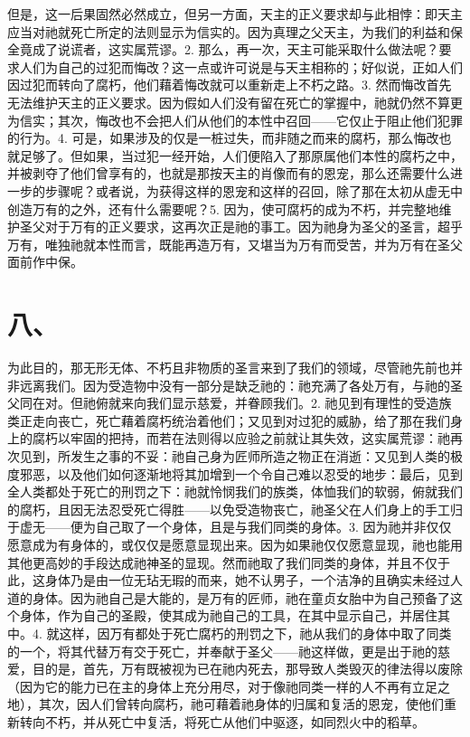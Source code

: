 但是，这一后果固然必然成立，但另一方面，天主的正义要求却与此相悖：即天主应当对祂就死亡所定的法则显示为信实的。因为真理之父天主，为我们的利益和保全竟成了说谎者，这实属荒谬。2. 那么，再一次，天主可能采取什么做法呢？要求人们为自己的过犯而悔改？这一点或许可说是与天主相称的；好似说，正如人们因过犯而转向了腐朽，他们藉着悔改就可以重新走上不朽之路。3. 然而悔改首先无法维护天主的正义要求。因为假如人们没有留在死亡的掌握中，祂就仍然不算更为信实；其次，悔改也不会把人们从他们的本性中召回——它仅止于阻止他们犯罪的行为。4. 可是，如果涉及的仅是一桩过失，而非随之而来的腐朽，那么悔改也就足够了。但如果，当过犯一经开始，人们便陷入了那原属他们本性的腐朽之中，并被剥夺了他们曾享有的，也就是那按天主的肖像而有的恩宠，那么还需要什么进一步的步骤呢？或者说，为获得这样的恩宠和这样的召回，除了那在太初从虚无中创造万有的之外，还有什么需要呢？5. 因为，使可腐朽的成为不朽，并完整地维护圣父对于万有的正义要求，这再次正是祂的事工。因为祂身为圣父的圣言，超乎万有，唯独祂就本性而言，既能再造万有，又堪当为万有而受苦，并为万有在圣父面前作中保。\par


\section{八、}

为此目的，那无形无体、不朽且非物质的圣言来到了我们的领域，尽管祂先前也并非远离我们。因为受造物中没有一部分是缺乏祂的：祂充满了各处万有，与祂的圣父同在对。但祂俯就来向我们显示慈爱，并眷顾我们。2. 祂见到有理性的受造族类正走向丧亡，死亡藉着腐朽统治着他们；又见到对过犯的威胁，给了那在我们身上的腐朽以牢固的把持，而若在法则得以应验之前就让其失效，这实属荒谬：祂再次见到，所发生之事的不妥：祂自己身为匠师所造之物正在消逝：又见到人类的极度邪恶，以及他们如何逐渐地将其加增到一个令自己难以忍受的地步：最后，见到全人类都处于死亡的刑罚之下：祂就怜悯我们的族类，体恤我们的软弱，俯就我们的腐朽，且因无法忍受死亡得胜——以免受造物丧亡，祂圣父在人们身上的手工归于虚无——便为自己取了一个身体，且是与我们同类的身体。3. 因为祂并非仅仅愿意成为有身体的，或仅仅是愿意显现出来。因为如果祂仅仅愿意显现，祂也能用其他更高妙的手段达成祂神圣的显现。然而祂取了我们同类的身体，并且不仅于此，这身体乃是由一位无玷无瑕的而来，她不认男子，一个洁净的且确实未经过人道的身体。因为祂自己是大能的，是万有的匠师，祂在童贞女胎中为自己预备了这个身体，作为自己的圣殿，使其成为祂自己的工具，在其中显示自己，并居住其中。4. 就这样，因万有都处于死亡腐朽的刑罚之下，祂从我们的身体中取了同类的一个，将其代替万有交于死亡，并奉献于圣父——祂这样做，更是出于祂的慈爱，目的是，首先，万有既被视为已在祂内死去，那导致人类毁灭的律法得以废除（因为它的能力已在主的身体上充分用尽，对于像祂同类一样的人不再有立足之地），其次，因人们曾转向腐朽，祂可藉着祂身体的归属和复活的恩宠，使他们重新转向不朽，并从死亡中复活，将死亡从他们中驱逐，如同烈火中的稻草。\par

